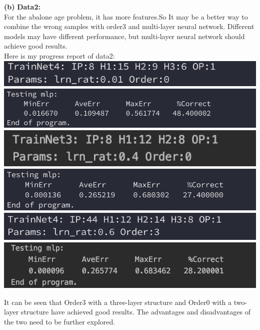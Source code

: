 \documentclass[11pt]{article}
\renewcommand\part[1]{\vspace{.10in}\textbf{(#1)}}
\newcommand\two{\vspace{.10in}\textbf{Data2: }}
\begin{document}
\part{b} \two\\
For the abalone age problem, it has more features.So It may be a better way to combine the wrong samples with order3 and multi-layer neural network. Different models may have different performance, but multi-layer neural network should achieve good results.\\
Here is my progress report of data2:\\
\includegraphics[scale=1]{2-in1.png}
\includegraphics[scale=0.8]{2-ot1.png}
\includegraphics[scale=1]{2-in2.png}
\includegraphics[scale=0.8]{2-ot2.png}
\includegraphics[scale=1]{2-in3.png}
\includegraphics[scale=0.8]{2-ot3.png}

It can be seen that Order3 with a three-layer structure and Order0 with a two-layer structure have achieved good results. The advantages and disadvantages of the two need to be further explored.
\end{document}
